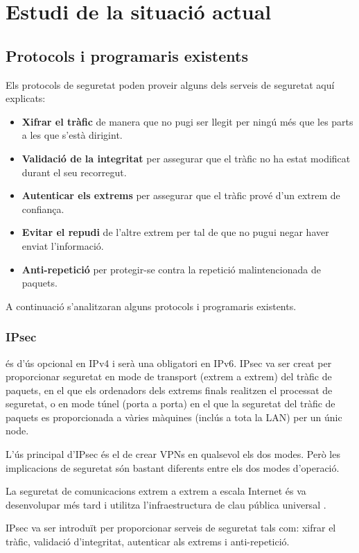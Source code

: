 \chapter{Estudi de la situació actual}
\section{Protocols i programaris existents}
Els protocols de seguretat poden proveir alguns dels serveis de seguretat aquí explicats:
\begin{itemize}
\item \textbf{Xifrar el tràfic} de manera que no pugi ser llegit per ningú més que les parts a les que s'està dirigint.
\item \textbf{Validació de la integritat} per assegurar que el tràfic no ha estat modificat durant el seu recorregut.
\item \textbf{Autenticar els extrems} per assegurar que el tràfic prové d'un extrem de confiança.
\item \textbf{Evitar el repudi} de l'altre extrem per tal de que no pugui negar haver enviat l'informació.
\item \textbf{Anti-repetició} per protegir-se contra la repetició malintencionada de paquets.
\end{itemize}

A continuació s'analitzaran alguns protocols i programaris existents.
\subsection{IPsec}
 és d'ús opcional en IPv4 i serà una obligatori en IPv6. IPsec va ser creat per proporcionar seguretat en mode de transport (extrem a extrem) del tràfic de paquets, en el que els ordenadors dels extrems finals realitzen el processat de seguretat, o en mode túnel (porta a porta) en el que la seguretat del tràfic de paquets es proporcionada a vàries màquines (inclús a tota la LAN) per un únic node.

L'ús principal d'IPsec és el de crear VPNs en qualsevol els dos modes. Però les implicacions de seguretat són bastant diferents entre els dos modes d'operació.

La seguretat de comunicacions extrem a extrem a escala Internet és va desenvolupar més tard i utilitza l'infraestructura de clau pública universal .

IPsec va ser introduït per proporcionar serveis de seguretat tals com: xifrar el tràfic, validació d'integritat, autenticar als extrems i anti-repetició.

